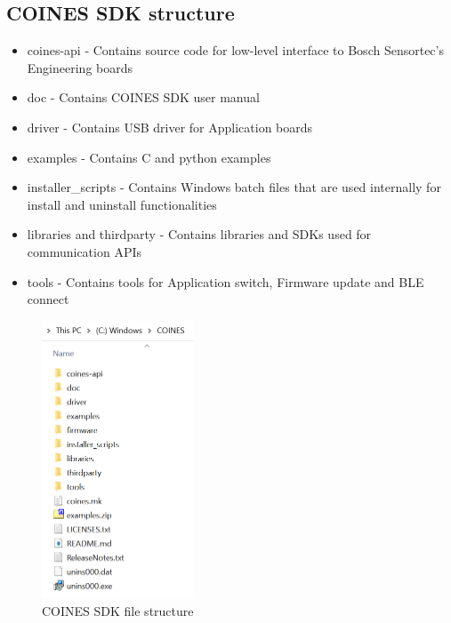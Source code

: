 \documentclass[11pt,headings=small]{scrartcl}
\begin{document}
\subsection{COINES SDK structure}
\begin{itemize}
	\item coines-api - Contains source code for low-level interface to Bosch Sensortec’s Engineering boards
	\item doc - Contains COINES SDK user manual
	\item driver - Contains USB driver for Application boards
	\item examples - Contains C and python examples 
	\item installer\_scripts - Contains Windows batch files that are used internally for install and uninstall functionalities
	\item libraries and thirdparty - Contains libraries and SDKs used for communication APIs
	\item tools - Contains tools for Application switch, Firmware update and BLE connect
\end{itemize}
\begin{figure}[H]
	\begin{center}
		\includegraphics[width=0.4\textwidth]{coinesAPI_images/COINES_file_structure.png}
		\caption{COINES SDK file structure}
	\end{center}
\end{figure}
\bstlastpage
\end{document}
